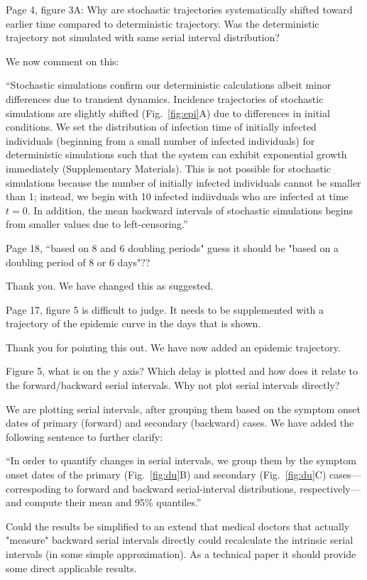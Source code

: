 \documentclass[12pt]{article}
\newcommand{\fref}[1]{Fig.~\ref{fig:#1}}
\newcommand{\revtext}{\textsf}
\begin{document}
\revtext{Page 4, figure 3A: Why are stochastic trajectories systematically shifted toward earlier time compared to deterministic trajectory. Was the deterministic trajectory not simulated with same serial interval distribution?}

We now comment on this:

``Stochastic simulations confirm our deterministic calculations albeit minor differences due to transient dynamics.
Incidence trajectories of stochastic simulations are slightly shifted (\fref{epi}A) due to differences in initial conditions. 
We set the distribution of infection time of initially infected individuals (beginning from a small number of infected individuals) for deterministic simulations such that the system can exhibit exponential growth immediately (Supplementary Materials).
This is not possible for stochastic simulations because the number of initially infected individuals cannot be smaller than 1; instead, we begin with 10 infected indiivduals who are infected at time $t=0$.
In addition, the mean backward intervals of stochastic simulations begins from smaller values due to left-censoring.''

\revtext{Page 18, ``based on 8 and 6 doubling periods" guess it should be "based on a doubling period of 8 or 6 days"??}

Thank you. We have changed this as suggested.

\revtext{Page 17, figure 5 is difficult to judge. It needs to be supplemented with a trajectory of the epidemic curve in the days that is shown.}

Thank you for pointing this out. We have now added an epidemic trajectory.

\revtext{Figure 5, what is on the y axis? Which delay is plotted and how does it relate to the forward/backward serial intervals. Why not plot serial intervals directly?}

We are plotting serial intervals, after grouping them based on the symptom onset dates of primary (forward) and secondary (backward) cases. We have added the following sentence to further clarify:

``In order to quantify changes in serial intervals, we group them by the symptom onset dates of the primary (\fref{du}B) and secondary (\fref{du}C) cases---correspoding to forward and backward serial-interval distributions, respectively---and compute their mean and 95\% quantiles.''

\revtext{Could the results be simplified to an extend that medical doctors that actually "measure" backward serial intervals directly could recalculate the intrinsic serial intervals (in some simple approximation). As a technical paper it should provide some direct applicable results.}
\end{document}

